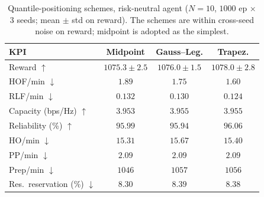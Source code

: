 \documentclass[conference]{IEEEtran}
\begin{document}
\begin{table}[htbp]
\caption{Quantile-positioning schemes, risk-neutral agent ($N{=}10$, $1000$ ep
$\times$ $3$ seeds; mean $\pm$ std on reward). The schemes are within cross-seed
noise on reward; midpoint is adopted as the simplest.}
\label{tab:qmode}
\begin{center}
\begin{tabular}{|l|c|c|c|}
\hline
\textbf{KPI} & \textbf{Midpoint} & \textbf{Gauss--Leg.} & \textbf{Trapez.} \\
\hline
Reward $\uparrow$                   & $1075.3\pm2.5$ & $1076.0\pm1.5$ & $1078.0\pm2.8$ \\
HOF/min $\downarrow$                & $1.89$  & $1.75$  & $1.60$  \\
RLF/min $\downarrow$                & $0.132$ & $0.130$ & $0.124$ \\
Capacity (bps/Hz) $\uparrow$        & $3.953$ & $3.955$ & $3.955$ \\
Reliability (\%) $\uparrow$         & $95.99$ & $95.94$ & $96.06$ \\
HO/min $\downarrow$                 & $15.31$ & $15.67$ & $15.40$ \\
PP/min $\downarrow$                 & $2.09$  & $2.09$  & $2.09$  \\
Prep/min $\downarrow$               & $1046$  & $1057$  & $1056$  \\
Res.\ reservation (\%) $\downarrow$ & $8.30$  & $8.39$  & $8.38$  \\
\hline
\end{tabular}
\end{center}
\end{table}
\end{document}
